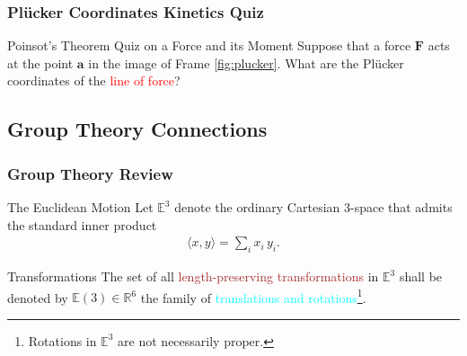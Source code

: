 

\begin{frame}
	\frametitle{Pl{\"u}cker Coordinates Kinetics Quiz}
	\begin{block}{Poinsot's Theorem Quiz on a  Force and its Moment}
		Suppose that a force $\bm{F}$  acts at the point $\bm{a}$ in the image of Frame \ref{fig:plucker}. What are the Pl{\"u}cker coordinates of the \textcolor{red}{line of force}?
	\end{block}
\end{frame}


\subsection{Group Theory Connections}
\begin{frame}
	\frametitle{Group Theory Review}
	\begin{block}{The Euclidean Motion}
		Let $\mathbb{E}^3$ denote the ordinary Cartesian 3-space that admits the standard inner product 
		\begin{align}
			\langle x, y \rangle = \sum_i x_i \, y_i.
		\end{align}
	\end{block}

	\begin{block}{Transformations}
		The set of all \textcolor{brown}{length-preserving transformations} in $\mathbb{E}^3$ shall be denoted by $\mathbb{E}(3) \in \mathbb{R}^6$ \ie the family of \textcolor{cyan}{translations and rotations}\footnote{Rotations in $\mathbb{E}^3$ are not necessarily proper.}.
	\end{block}
\end{frame}


